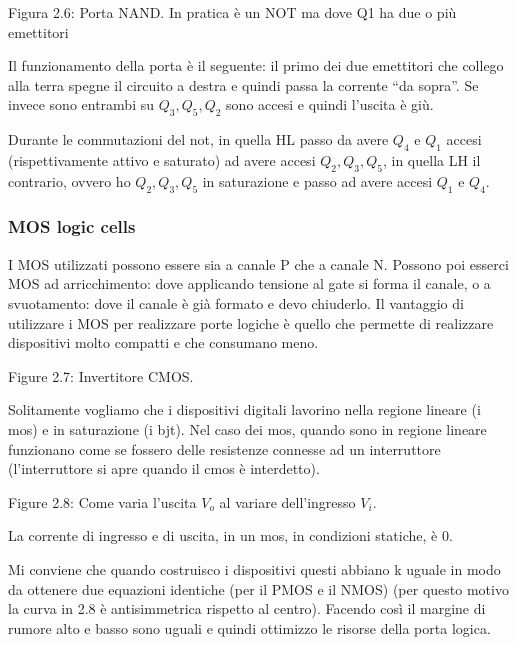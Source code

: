 \documentclass[
]{article}
\begin{document}
Figura 2.6: Porta NAND. In pratica è un NOT ma dove Q1 ha due o più
emettitori

Il funzionamento della porta è il seguente: il primo dei due emettitori
che collego alla terra spegne il circuito a destra e quindi passa la
corrente ``da sopra''. Se invece sono entrambi su \(Q_{3},Q_{5},Q_{2}\)
sono accesi e quindi l'uscita è giù.

Durante le commutazioni del not, in quella HL passo da avere \(Q_{4}\) e
\(Q_{1}\) accesi (rispettivamente attivo e saturato) ad avere accesi
\(Q_{2},Q_{3},Q_{5}\), in quella LH il contrario, ovvero ho
\(Q_{2},Q_{3},Q_{5}\) in saturazione e passo ad avere accesi \(Q_{1}\) e
\(Q_{4}\).

\subsubsection{MOS logic cells}\label{mos-logic-cells}

I MOS utilizzati possono essere sia a canale P che a canale N. Possono
poi esserci MOS ad arricchimento: dove applicando tensione al gate si
forma il canale, o a svuotamento: dove il canale è già formato e devo
chiuderlo. Il vantaggio di utilizzare i MOS per realizzare porte logiche
è quello che permette di realizzare dispositivi molto compatti e che
consumano meno.

Figure 2.7: Invertitore CMOS.

Solitamente vogliamo che i dispositivi digitali lavorino nella regione
lineare (i mos) e in saturazione (i bjt). Nel caso dei mos, quando sono
in regione lineare funzionano come se fossero delle resistenze connesse
ad un interruttore (l'interruttore si apre quando il cmos è interdetto).

Figure 2.8: Come varia l'uscita \(V_{o}\) al variare dell'ingresso
\(V_{i}\).

La corrente di ingresso e di uscita, in un mos, in condizioni statiche,
è 0.

Mi conviene che quando costruisco i dispositivi questi abbiano k uguale
in modo da ottenere due equazioni identiche (per il PMOS e il NMOS) (per
questo motivo la curva in 2.8 è antisimmetrica rispetto al centro).
Facendo così il margine di rumore alto e basso sono uguali e quindi
ottimizzo le risorse della porta logica.
\end{document}
